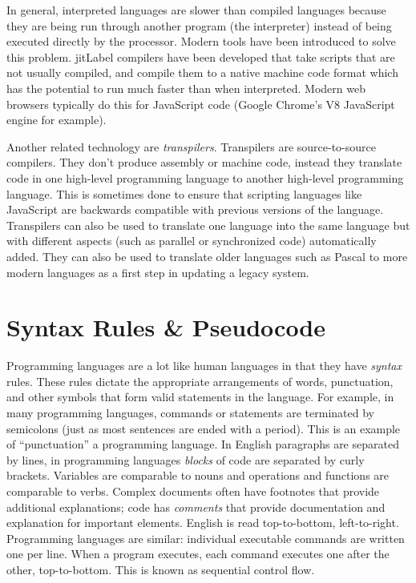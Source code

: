 In general, interpreted languages are slower than compiled languages because
they are being run through another program (the interpreter) instead of
being executed directly by the processor.  Modern tools
have been introduced to solve this problem.  \gls{jitLabel} compilers have
been developed that take scripts that are not usually compiled, and compile
them to a native machine code format which has the potential to run 
much faster than when interpreted.  Modern web browsers typically do this
for JavaScript code (Google Chrome's V8 JavaScript engine for example).

Another related technology are  \emph{transpilers}.  
Transpilers are source-to-source compilers.  They 
don't produce assembly
or machine code, instead they translate code in one high-level programming
language to another high-level programming language.  This is sometimes 
done to ensure that scripting languages
like JavaScript are backwards compatible with previous versions of the language.
Transpilers can also be used to translate one language into the same language
but with different aspects (such as parallel or synchronized code) automatically
added.  They can also be used to translate older languages such as Pascal
to more modern languages as a first step in updating a legacy system.

\section{Syntax Rules \& Pseudocode}

Programming languages are a lot like human languages in that they have 
\emph{syntax} rules.  These rules dictate the appropriate arrangements 
of words, punctuation, and other symbols that form valid statements in the 
language.  For example, in many programming languages, commands or statements 
are terminated by semicolons (just as most sentences are ended 
with a period).  This is an example of ``punctuation'' a programming 
language.  In English paragraphs are separated by lines, in programming
languages \emph{blocks} of code are separated by curly brackets.  
Variables are comparable to nouns and operations and functions are 
comparable to verbs.  Complex documents often have footnotes that
provide additional explanations; code has \emph{comments} that provide
documentation and explanation for important elements. English is read 
top-to-bottom, left-to-right.  Programming languages 
are similar: individual executable commands are written one per line.  When 
a program executes, each command executes one after the other, top-to-bottom.  
This is known as  sequential control flow.

